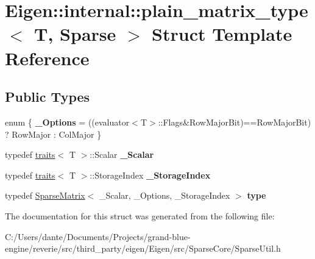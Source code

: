 \hypertarget{struct_eigen_1_1internal_1_1plain__matrix__type_3_01_t_00_01_sparse_01_4}{}\section{Eigen\+::internal\+::plain\+\_\+matrix\+\_\+type$<$ T, Sparse $>$ Struct Template Reference}
\label{struct_eigen_1_1internal_1_1plain__matrix__type_3_01_t_00_01_sparse_01_4}
\subsection*{Public Types}
\begin{DoxyCompactItemize}
\item 
\mbox{\label{struct_eigen_1_1internal_1_1plain__matrix__type_3_01_t_00_01_sparse_01_4_a9cdaad1ff9098c3225446277b1061980}} 
enum \{ {\bfseries \+\_\+\+Options} = ((evaluator$<$T$>$\+::Flags\&Row\+Major\+Bit)==Row\+Major\+Bit) ? Row\+Major \+: Col\+Major
 \}
\item 
\mbox{\label{struct_eigen_1_1internal_1_1plain__matrix__type_3_01_t_00_01_sparse_01_4_a18510fea488fb8c93b18fcf63b0765a0}} 
typedef \mbox{\hyperlink{struct_eigen_1_1internal_1_1traits}{traits}}$<$ T $>$\+::Scalar {\bfseries \+\_\+\+Scalar}
\item 
\mbox{\label{struct_eigen_1_1internal_1_1plain__matrix__type_3_01_t_00_01_sparse_01_4_adbc2fc3f639bed115439b45259050bb1}} 
typedef \mbox{\hyperlink{struct_eigen_1_1internal_1_1traits}{traits}}$<$ T $>$\+::Storage\+Index {\bfseries \+\_\+\+Storage\+Index}
\item 
\mbox{\label{struct_eigen_1_1internal_1_1plain__matrix__type_3_01_t_00_01_sparse_01_4_aa58945e4be9a73cd2b6388ba5928c33b}} 
typedef \mbox{\hyperlink{class_eigen_1_1_sparse_matrix}{Sparse\+Matrix}}$<$ \+\_\+\+Scalar, \+\_\+\+Options, \+\_\+\+Storage\+Index $>$ {\bfseries type}
\end{DoxyCompactItemize}


The documentation for this struct was generated from the following file\+:\begin{DoxyCompactItemize}
\item 
C\+:/\+Users/dante/\+Documents/\+Projects/grand-\/blue-\/engine/reverie/src/third\+\_\+party/eigen/\+Eigen/src/\+Sparse\+Core/Sparse\+Util.\+h\end{DoxyCompactItemize}
